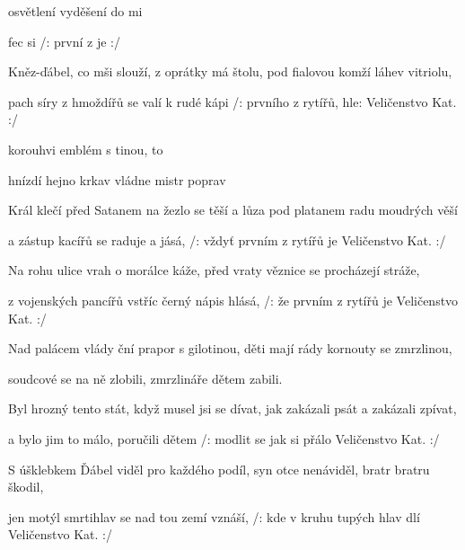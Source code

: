 

			

\zs
{} osvětlení  
 vyděšení  do mi

fec  si 
/:  první z  je   :/
\ks

\zs
Kněz-ďábel, co mši slouží, z oprátky má štolu,
pod fialovou komží láhev vitriolu,

pach síry z hmoždířů se valí k rudé kápi
/: prvního z rytířů, hle: Veličenstvo Kat. :/
\ks

\zr
{} korouhvi   emblém s tinou,
   to 

 hnízdí hejno krkav
 vládne mistr poprav
\kr

\zs
Král klečí před Satanem na žezlo se těší
a lůza pod platanem radu moudrých věší

a zástup kacířů se raduje a jásá,
/: vždyť prvním z rytířů je Veličenstvo Kat. :/
\ks

\zs
Na rohu ulice vrah o morálce káže,
před vraty věznice se procházejí stráže,

z vojenských pancířů vstříc černý nápis hlásá,
/: že prvním z rytířů je Veličenstvo Kat. :/
\ks

\zr
Nad palácem vlády ční prapor s gilotinou,
děti mají rády kornouty se zmrzlinou,

soudcové se na ně zlobili,
zmrzlináře dětem zabili.
\kr

\zs
Byl hrozný tento stát, když musel jsi se dívat,
jak zakázali psát a zakázali zpívat,

a bylo jim to málo, poručili dětem
/: modlit se jak si přálo Veličenstvo Kat. :/
\ks

\zs
S úšklebkem Ďábel viděl pro každého podíl,
syn otce nenáviděl, bratr bratru škodil,

jen motýl smrtihlav se nad tou zemí vznáší,
/: kde v kruhu tupých hlav dlí Veličenstvo Kat. :/
\ks

\kp
